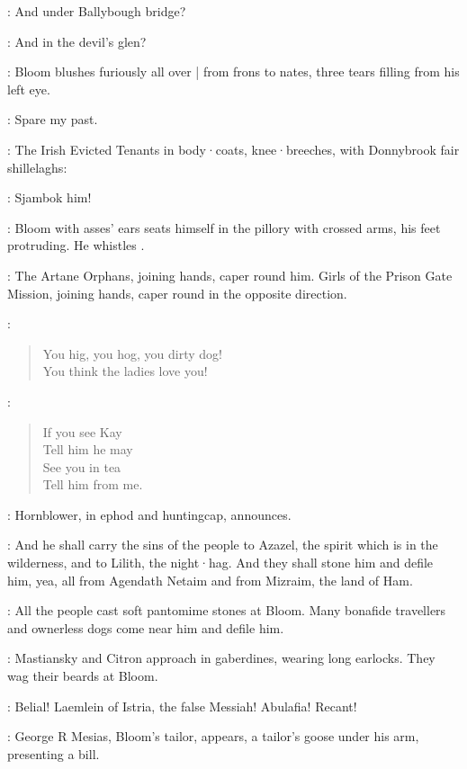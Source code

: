 \FemaleInfant:
And under Ballybough bridge?

\Hollybush:
And in the devil's glen?

:
Bloom blushes furiously all over |
from frons to nates,
three tears filling from his left eye.

\Bloom:
Spare my past.

:
The Irish Evicted Tenants in body·coats,
knee·breeches,
with Donnybrook fair shillelaghs:

\EvictedTenants:
Sjambok him!

:
Bloom with asses' ears seats himself in the pillory with crossed arms,
his feet protruding.
He whistles .

:
The Artane Orphans,
joining hands,
caper round him.
Girls of the Prison Gate Mission,
joining hands,
caper round in the opposite direction.

\ArtaneOrphans:
\begin{verse}
%
    You hig, you hog, you dirty dog!\\
    You think the ladies love you!
\end{verse}

\PrisonGateGirls[1]:
\begin{verse}
    If you see Kay\\
    Tell him he may\\
    See you in tea\\
    Tell him from me.
\end{verse}

:
Hornblower,
in ephod and huntingcap,
announces.

\Hornblower:
And he shall carry the sins of the people to Azazel,
the spirit which is in the wilderness,
and to Lilith,
the night·hag.
And they shall stone him and defile him,
yea,
all from Agendath Netaim and from Mizraim,
the land of Ham.

:
All the people cast soft pantomime stones at Bloom.
Many bonafide travellers and ownerless dogs come near him and defile him.

:
Mastiansky and Citron approach in gaberdines,
wearing long earlocks.
They wag their beards at Bloom.

\MastianskyCitron:
Belial!
Laemlein of Istria,
the false Messiah!
Abulafia!
Recant!

:
George R Mesias,
Bloom's tailor,
appears,
a tailor's goose under his arm,
presenting a bill.

